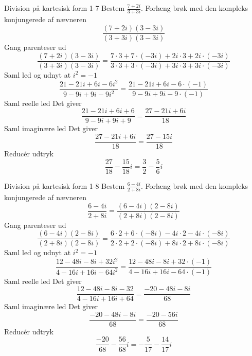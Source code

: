 \documentclass{article}
\begin{document}
\newpage
\begin{exercise}{Division på kartesisk form 1-7}
Bestem $\frac{7 + 2i}{3 + 3i}$.
\hint
Forlæng brøk med den kompleks konjungerede af nævneren
\[\frac{(7 + 2i)(3 - 3i)}{(3 + 3i)(3 - 3i)}
\]
\hint
Gang parenteser ud
\[\frac{(7 + 2i)(3 - 3i)}{(3 + 3i)(3 - 3i)} = \frac{7 \cdot 3 + 7 \cdot (-3i) + 2i \cdot 3 + 2i \cdot (-3i)}{3 \cdot 3 + 3 \cdot (-3i) + 3i \cdot 3 + 3i \cdot (-3i)}
\]
\hint
Saml led og udnyt at $i^2 = - 1$
\[\frac{21 - 21i + 6i - 6i^2}{9 - 9 i + 9i - 9i^2} = \frac{21 - 21i + 6i - 6 \cdot (-1)}{9 - 9 i + 9i - 9 \cdot (-1)}
\]
\hint
Saml reelle led
\hint
Det giver
\[\frac{21 - 21i + 6i + 6}{9 - 9 i + 9i + 9} = \frac{27 - 21i + 6i}{18}
\]
\hint
Saml imaginære led
\hint
Det giver
\[\frac{27 - 21i + 6i}{18} = \frac{27 - 15i}{18}
\]
\hint
Reducér udtryk
\[\frac{27}{18} - \frac{15}{18}i = \frac{3}{2} - \frac{5}{6}i
\]
\end{exercise}
\newpage
\begin{exercise}{Division på kartesisk form 1-8}
Bestem $\frac{6 - 4i}{2 + 8i}$.
\hint
Forlæng brøk med den kompleks konjungerede af nævneren
\[\frac{6 - 4i}{2 + 8i} = \frac{(6 - 4i)(2 - 8i)}{(2 + 8i)(2 - 8i)}
\]
\hint
Gang parenteser ud
\[\frac{(6 - 4i)(2 - 8i)}{(2 + 8i)(2 - 8i)} = \frac{6 \cdot 2 + 6 \cdot (-8i) - 4i \cdot 2 - 4i \cdot (-8i)}{2 \cdot 2 + 2 \cdot (-8i) + 8i \cdot 2 + 8i \cdot (-8i)}
\]
\hint
Saml led og udnyt at $i^2 = - 1$
\[\frac{12 - 48i - 8i + 32i^2}{4 - 16i + 16i - 64i^2} = \frac{12 - 48i - 8i + 32 \cdot (-1)}{4 - 16i + 16i - 64 \cdot (-1)}
\]
\hint
Saml reelle led
\hint
Det giver
\[\frac{12 - 48i - 8i - 32}{4 - 16i + 16i + 64} = \frac{ - 20 - 48i - 8i}{68}
\]
\hint
Saml imaginære led
\hint
Det giver
\[\frac{ - 20 - 48i - 8i}{68} = \frac{ - 20 - 56i}{68}
\]
\hint
Reducér udtryk
\[\frac{ - 20}{68} - \frac{56}{68}i = - \frac{5}{17} - \frac{14}{17}i
\]
\end{exercise}
\end{document}

